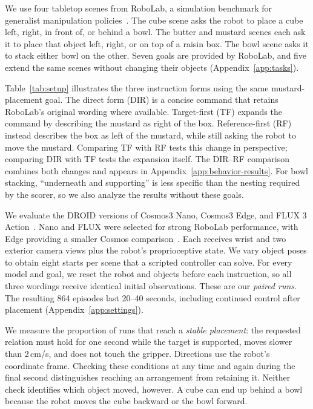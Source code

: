 \documentclass{article}
\begin{document}
We use four tabletop scenes from RoboLab, a simulation benchmark for generalist manipulation policies~\citep{yang2026robolab}. The cube scene asks the robot to place a cube left, right, in front of, or behind a bowl. The butter and mustard scenes each ask it to place that object left, right, or on top of a raisin box. The bowl scene asks it to stack either bowl on the other. Seven goals are provided by RoboLab, and five extend the same scenes without changing their objects (Appendix~\ref{app:tasks}).

Table~\ref{tab:setup} illustrates the three instruction forms using the same mustard-placement goal. The direct form (DIR) is a concise command that retains RoboLab's original wording where available. Target-first (TF) expands the command by describing the mustard as right of the box. Reference-first (RF) instead describes the box as left of the mustard, while still asking the robot to move the mustard. Comparing TF with RF tests this change in perspective; comparing DIR with TF tests the expansion itself. The DIR--RF comparison combines both changes and appears in Appendix~\ref{app:behavior-results}. For bowl stacking, ``underneath and supporting'' is less specific than the nesting required by the scorer, so we also analyze the results without these goals.

We evaluate the DROID versions of Cosmos3 Nano, Cosmos3 Edge, and FLUX 3 Action~\citep{nvidia2026nano,nvidia2026edge,bfl2026fluxaction}. Nano and FLUX were selected for strong RoboLab performance, with Edge providing a smaller Cosmos comparison~\citep{robolab2026leaderboard}. Each receives wrist and two exterior camera views plus the robot's proprioceptive state. We vary object poses to obtain eight starts per scene that a scripted controller can solve. For every model and goal, we reset the robot and objects before each instruction, so all three wordings receive identical initial observations. These are our \emph{paired runs}. The resulting 864 episodes last 20--40 seconds, including continued control after placement (Appendix~\ref{app:settings}).

We measure the proportion of runs that reach a \emph{stable placement}: the requested relation must hold for one second while the target is supported, moves slower than 2\,cm/s, and does not touch the gripper. Directions use the robot's coordinate frame. Checking these conditions at any time and again during the final second distinguishes reaching an arrangement from retaining it. Neither check identifies which object moved, however. A cube can end up behind a bowl because the robot moves the cube backward or the bowl forward.
\end{document}
